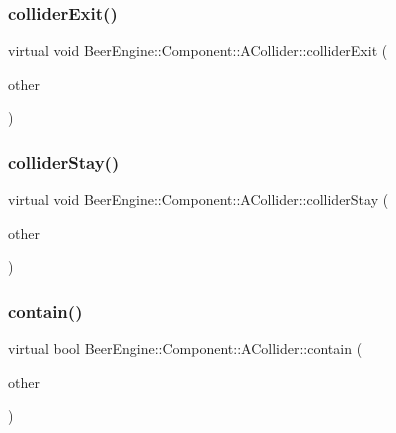 \subsubsection{\texorpdfstring{collider\+Exit()}{colliderExit()}}
{\footnotesize\ttfamily virtual void Beer\+Engine\+::\+Component\+::\+A\+Collider\+::collider\+Exit (\begin{DoxyParamCaption}\item[{\mbox{\hyperlink{class_beer_engine_1_1_component_1_1_a_collider}{A\+Collider}} $\ast$}]{other }\end{DoxyParamCaption})\hspace{0.3cm}{\ttfamily [virtual]}}

\mbox{\label{class_beer_engine_1_1_component_1_1_a_collider_a6407be22d828a4515dd16bb3c552f36d}} 
\subsubsection{\texorpdfstring{collider\+Stay()}{colliderStay()}}
{\footnotesize\ttfamily virtual void Beer\+Engine\+::\+Component\+::\+A\+Collider\+::collider\+Stay (\begin{DoxyParamCaption}\item[{\mbox{\hyperlink{class_beer_engine_1_1_component_1_1_a_collider}{A\+Collider}} $\ast$}]{other }\end{DoxyParamCaption})\hspace{0.3cm}{\ttfamily [virtual]}}

\mbox{\label{class_beer_engine_1_1_component_1_1_a_collider_a3d7b4784b8ba49a9d0fe72e8ff00ad1e}} 
\subsubsection{\texorpdfstring{contain()}{contain()}}
{\footnotesize\ttfamily virtual bool Beer\+Engine\+::\+Component\+::\+A\+Collider\+::contain (\begin{DoxyParamCaption}\item[{glm\+::vec2}]{other }\end{DoxyParamCaption})\hspace{0.3cm}{\ttfamily [pure virtual]}}



